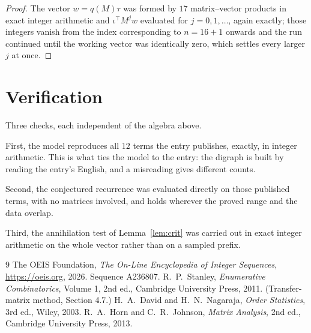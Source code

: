 \documentclass[11pt,a4paper]{article}
\theoremstyle{plain}
\theoremstyle{definition}
\begin{document}
\begin{proof}
The vector $w=q(M)\tau$ was formed by $17$ matrix--vector products in exact integer
arithmetic and $\iota^{\!\top}M^{j}w$ evaluated for $j=0,1,\dots$, again exactly; those
integers vanish from the index corresponding to $n=16+1$ onwards and the run continued
until the working vector was identically zero, which settles every larger $j$ at once.
\end{proof}

\section{Verification}

Three checks, each independent of the algebra above.

First, the model reproduces all $12$ terms the entry publishes, exactly, in integer
arithmetic. This is what ties the model to the entry: the digraph is built by reading the
entry's English, and a misreading gives different counts.

Second, the conjectured recurrence was evaluated directly on those published terms, with no
matrices involved, and holds wherever the proved range and the data overlap.

Third, the annihilation test of Lemma~\ref{lem:crit} was carried out in exact integer
arithmetic on the whole vector rather than on a sampled prefix.

\begin{thebibliography}{9}
 The OEIS Foundation, \emph{The On-Line Encyclopedia of Integer
Sequences}, \url{https://oeis.org}, 2026. Sequence A236807.
 R.~P.~Stanley, \emph{Enumerative Combinatorics}, Volume 1, 2nd ed.,
Cambridge University Press, 2011. (Transfer-matrix method, Section 4.7.)
 H.~A.~David and H.~N.~Nagaraja, \emph{Order Statistics}, 3rd ed., Wiley,
2003.
 R.~A.~Horn and C.~R.~Johnson, \emph{Matrix Analysis}, 2nd ed., Cambridge
University Press, 2013.
\end{thebibliography}
\end{document}
